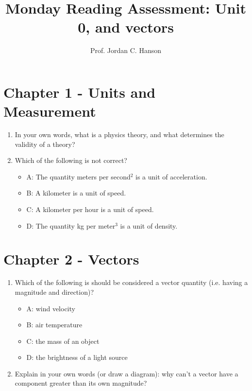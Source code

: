 \documentclass{article}
\begin{document}
\title{Monday Reading Assessment: Unit 0, and vectors}
\author{Prof. Jordan C. Hanson}

\maketitle

\section{Chapter 1 - Units and Measurement}

\begin{enumerate}
\item In your own words, what is a physics theory, and what determines the validity of a theory? \\ \vspace{2cm}
\item Which of the following is not correct?
\begin{itemize}
\item A: The quantity meters per second$^2$ is a unit of acceleration.
\item B: A kilometer is a unit of speed.
\item C: A kilometer per hour is a unit of speed.
\item D: The quantity kg per meter$^3$ is a unit of density.
\end{itemize} \vspace{2cm}
\end{enumerate}

\section{Chapter 2 - Vectors}

\begin{enumerate}
\item Which of the following is should be considered a vector quantity (i.e. having a magnitude and direction)?
\begin{itemize}
\item A: wind velocity
\item B: air temperature
\item C: the mass of an object
\item D: the brightness of a light source
\end{itemize}
\item Explain in your own words (or draw a diagram): why can't a vector have a component greater than its own magnitude?
\end{enumerate}
\end{document}
